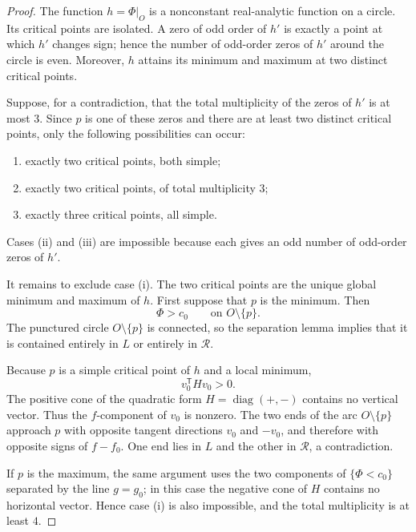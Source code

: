 \documentclass[10pt,reqno]{amsart}
\numberwithin{equation}{section}
\theoremstyle{plain}
\theoremstyle{remark}
\newcommand{\restr}[2]{#1\big|_{#2}}
\begin{document}
\begin{proof}
The function $h=\restr{\Phi}{O}$ is a nonconstant real-analytic function
on a circle.  Its critical points are isolated.  A zero of odd order of
$h'$ is exactly a point at which $h'$ changes sign; hence the number of
odd-order zeros of $h'$ around the circle is even.  Moreover, $h$ attains
its minimum and maximum at two distinct critical points.

Suppose, for a contradiction, that the total multiplicity of the zeros
of $h'$ is at most $3$.  Since $p$ is one of these zeros and there are at
least two distinct critical points, only the following possibilities can
occur:
\begin{enumerate}[label=\textup{(\roman*)},leftmargin=2.4em]
  \item exactly two critical points, both simple;
  \item exactly two critical points, of total multiplicity $3$;
  \item exactly three critical points, all simple.
\end{enumerate}
Cases \textup{(ii)} and \textup{(iii)} are impossible because each gives
an odd number of odd-order zeros of $h'$.

It remains to exclude case \textup{(i)}.  The two critical points are the
unique global minimum and maximum of $h$.  First suppose that $p$ is the
minimum.  Then
\begin{equation}\label{eq:Phi-above}
  \Phi>c_0\qquad\text{on }O\setminus\{p\}.
\end{equation}
The punctured circle $O\setminus\{p\}$ is connected, so the separation
lemma implies that it is contained entirely in $L$ or entirely in
$\mathcal R$.

Because $p$ is a simple critical point of $h$ and a local minimum,
\begin{equation}\label{eq:positive-tangent}
  v_0^{\mathsf T}Hv_0>0.
\end{equation}
The positive cone of the quadratic form
$H=\operatorname{diag}(+,-)$ contains no vertical vector.  Thus the
$f$-component of $v_0$ is nonzero.  The two ends of the arc
$O\setminus\{p\}$ approach $p$ with opposite tangent directions $v_0$
and $-v_0$, and therefore with opposite signs of $f-f_0$.  One end lies
in $L$ and the other in $\mathcal R$, a contradiction.

If $p$ is the maximum, the same argument uses the two components of
$\{\Phi<c_0\}$ separated by the line $g=g_0$; in this case the negative
cone of $H$ contains no horizontal vector.  Hence case
\textup{(i)} is also impossible, and the total multiplicity is at least
$4$.
\end{proof}
\end{document}

